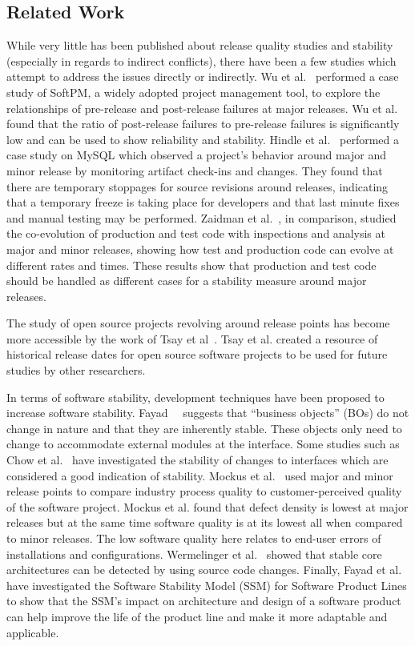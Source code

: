 \subsection{Related Work}
\label{sec:rel}
While very little has been published about release quality studies and stability (especially in regards to
indirect conflicts), there have been a few studies which attempt to address the issues directly
or indirectly. Wu et al.~\cite{Wu:2008:QAF} performed a case study of SoftPM, a widely adopted project management tool, to explore the relationships of
pre-release and post-release failures at major releases. Wu et al. found that the ratio of post-release failures to pre-release failures is significantly low
and can be used to show reliability and stability. Hindle et al.~\cite{Hindle:2007:RPD} performed a case study on MySQL which observed a project's behavior
around major and minor release by monitoring artifact check-ins and changes. They found that there are temporary stoppages for source revisions around releases,
indicating that a temporary freeze is taking place for developers and that last minute fixes and manual testing may be performed.
Zaidman et al.~\cite{Zaidman:2011:SCP}, in comparison, studied the co-evolution of production and test code with inspections and analysis
at major and minor releases, showing how test and production code can evolve at different rates and times. These results show that production
and test code should be handled as different cases for a stability measure around major releases. 

The study of open source projects revolving around release points has become more accessible by the work of Tsay et al~\cite{Tsay:2011:EMO}. Tsay et al. created
a resource of historical release dates for open source software projects to be used for future studies by other researchers.

In terms of software stability, development techniques have been proposed to increase software stability. 
Fayad~\cite{Fayad:2001:TOI}~\cite{Fayad:2002:ASS} suggests that ``business objects'' (BOs) do not change in nature and that they are inherently stable. These
objects only need to change to accommodate external modules at the interface. Some studies such as Chow et al.~\cite{Chow:2011:SJI} have investigated
the stability of changes to interfaces which are considered a good indication of stability.
Mockus et al.~\cite{Mockus:2008:IQR} used major and minor release points to compare industry process quality to customer-perceived quality of the software
project. Mockus et al. found that defect density is lowest at major releases but at the same time software quality is at its lowest all when compared to minor
releases. The low software quality here relates to end-user errors of installations and configurations. Wermelinger et al.~\cite{Wermelinger:2008:AEE}
showed that stable core architectures can be detected by using source code changes. Finally, Fayad et al.~\cite{Fayad:2010:SSM} have
investigated the Software Stability Model (SSM) for Software Product Lines to show that the SSM's impact on architecture and design of a software product
can help improve the life of the product line and make it more adaptable and applicable.

